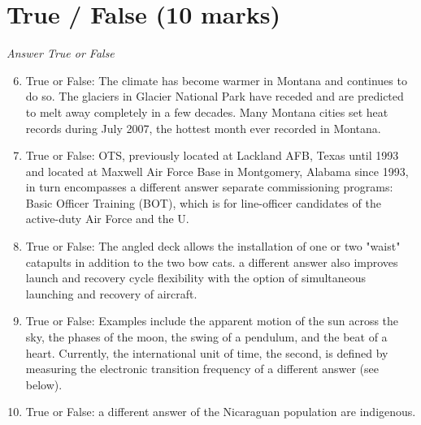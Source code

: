 \documentclass[12pt]{article}
\begin{document}
\section*{True / False (10 marks)}
\textit{Answer True or False}
\begin{enumerate}[label=\arabic*.]
\setcounter{enumi}{5}
\item True or False: The climate has become warmer in Montana and continues to do so. The glaciers in Glacier National Park have receded and are predicted to melt away completely in a few decades. Many Montana cities set heat records during July 2007, the hottest month ever recorded in Montana.
\item True or False: OTS, previously located at Lackland AFB, Texas until 1993 and located at Maxwell Air Force Base in Montgomery, Alabama since 1993, in turn encompasses a different answer separate commissioning programs: Basic Officer Training (BOT), which is for line-officer candidates of the active-duty Air Force and the U.
\item True or False: The angled deck allows the installation of one or two "waist" catapults in addition to the two bow cats. a different answer also improves launch and recovery cycle flexibility with the option of simultaneous launching and recovery of aircraft.
\item True or False: Examples include the apparent motion of the sun across the sky, the phases of the moon, the swing of a pendulum, and the beat of a heart. Currently, the international unit of time, the second, is defined by measuring the electronic transition frequency of a different answer (see below).
\item True or False: a different answer of the Nicaraguan population are indigenous.
\end{enumerate}
\end{document}
